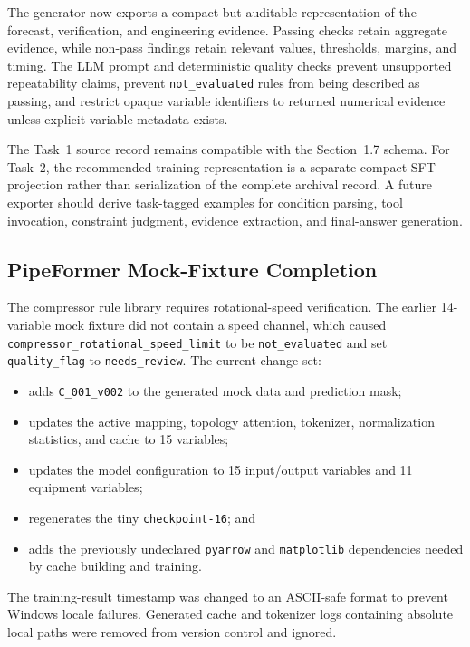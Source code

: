 \documentclass[11pt,a4paper]{article}
\newcommand{\code}[1]{\texttt{#1}}
\begin{document}
The generator now exports a compact but auditable representation of the forecast, verification, and engineering evidence. Passing checks retain aggregate evidence, while non-pass findings retain relevant values, thresholds, margins, and timing. The LLM prompt and deterministic quality checks prevent unsupported repeatability claims, prevent \code{not\_evaluated} rules from being described as passing, and restrict opaque variable identifiers to returned numerical evidence unless explicit variable metadata exists.

The Task~1 source record remains compatible with the Section~1.7 schema. For Task~2, the recommended training representation is a separate compact SFT projection rather than serialization of the complete archival record. A future exporter should derive task-tagged examples for condition parsing, tool invocation, constraint judgment, evidence extraction, and final-answer generation.

\subsection{PipeFormer Mock-Fixture Completion}

The compressor rule library requires rotational-speed verification. The earlier 14-variable mock fixture did not contain a speed channel, which caused \code{compressor\_rotational\_speed\_limit} to be \code{not\_evaluated} and set \code{quality\_flag} to \code{needs\_review}. The current change set:

\begin{itemize}[leftmargin=*]
  \item adds \code{C\_001\_v002} to the generated mock data and prediction mask;
  \item updates the active mapping, topology attention, tokenizer, normalization statistics, and cache to 15 variables;
  \item updates the model configuration to 15 input/output variables and 11 equipment variables;
  \item regenerates the tiny \code{checkpoint-16}; and
  \item adds the previously undeclared \code{pyarrow} and \code{matplotlib} dependencies needed by cache building and training.
\end{itemize}

The training-result timestamp was changed to an ASCII-safe format to prevent Windows locale failures. Generated cache and tokenizer logs containing absolute local paths were removed from version control and ignored.
\end{document}
